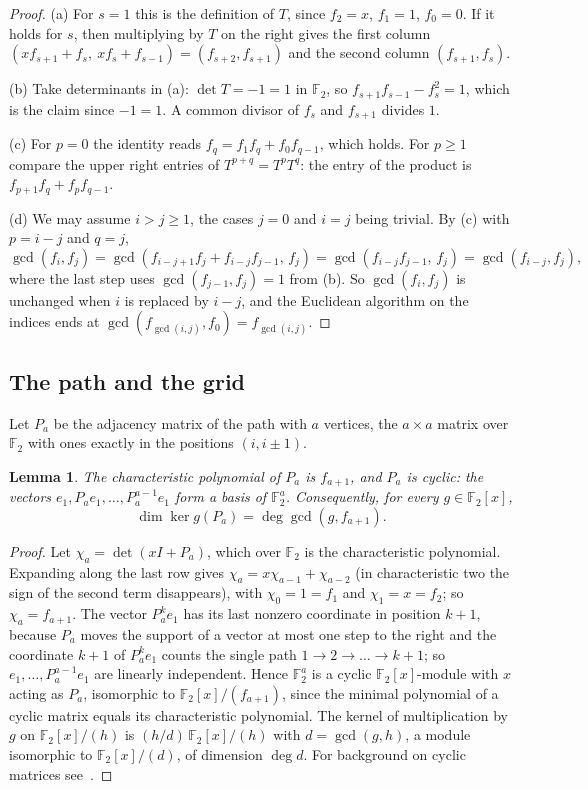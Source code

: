 \documentclass[11pt]{amsart}
\newtheorem{lemma}[theorem]{Lemma}
\theoremstyle{definition}
\theoremstyle{remark}
\numberwithin{equation}{section}
\newcommand{\F}{\mathbb{F}}
\begin{document}
\begin{proof}
(a) For $s=1$ this is the definition of $T$, since $f_2=x$, $f_1=1$, $f_0=0$. If it holds for $s$, then multiplying by $T$ on the right gives the first column $(xf_{s+1}+f_s,\ xf_s+f_{s-1})=(f_{s+2},f_{s+1})$ and the second column $(f_{s+1},f_s)$.

(b) Take determinants in (a): $\det T=-1=1$ in $\F_2$, so $f_{s+1}f_{s-1}-f_s^2=1$, which is the claim since $-1=1$. A common divisor of $f_s$ and $f_{s+1}$ divides $1$.

(c) For $p=0$ the identity reads $f_q=f_1f_q+f_0f_{q-1}$, which holds. For $p\ge1$ compare the upper right entries of $T^{p+q}=T^pT^q$: the entry of the product is $f_{p+1}f_q+f_pf_{q-1}$.

(d) We may assume $i>j\ge1$, the cases $j=0$ and $i=j$ being trivial. By (c) with $p=i-j$ and $q=j$,
\[
\gcd(f_i,f_j)=\gcd(f_{i-j+1}f_j+f_{i-j}f_{j-1},\,f_j)=\gcd(f_{i-j}f_{j-1},\,f_j)=\gcd(f_{i-j},f_j),
\]
where the last step uses $\gcd(f_{j-1},f_j)=1$ from (b). So $\gcd(f_i,f_j)$ is unchanged when $i$ is replaced by $i-j$, and the Euclidean algorithm on the indices ends at $\gcd(f_{\gcd(i,j)},f_0)=f_{\gcd(i,j)}$.
\end{proof}

\subsection{The path and the grid}

Let $P_a$ be the adjacency matrix of the path with $a$ vertices, the $a\times a$ matrix over $\F_2$ with ones exactly in the positions $(i,i\pm1)$.

\begin{lemma}\label{lem:pathmatrix}
The characteristic polynomial of $P_a$ is $f_{a+1}$, and $P_a$ is cyclic: the vectors $e_1,P_ae_1,\dots,P_a^{a-1}e_1$ form a basis of $\F_2^a$. Consequently, for every $g\in\F_2[x]$,
\[
\dim\ker g(P_a)=\deg\gcd(g,f_{a+1}).
\]
\end{lemma}

\begin{proof}
Let $\chi_a=\det(xI+P_a)$, which over $\F_2$ is the characteristic polynomial. Expanding along the last row gives $\chi_a=x\chi_{a-1}+\chi_{a-2}$ (in characteristic two the sign of the second term disappears), with $\chi_0=1=f_1$ and $\chi_1=x=f_2$; so $\chi_a=f_{a+1}$. The vector $P_a^ke_1$ has its last nonzero coordinate in position $k+1$, because $P_a$ moves the support of a vector at most one step to the right and the coordinate $k+1$ of $P_a^ke_1$ counts the single path $1\to2\to\dots\to k+1$; so $e_1,\dots,P_a^{a-1}e_1$ are linearly independent. Hence $\F_2^a$ is a cyclic $\F_2[x]$-module with $x$ acting as $P_a$, isomorphic to $\F_2[x]/(f_{a+1})$, since the minimal polynomial of a cyclic matrix equals its characteristic polynomial. The kernel of multiplication by $g$ on $\F_2[x]/(h)$ is $(h/d)\,\F_2[x]/(h)$ with $d=\gcd(g,h)$, a module isomorphic to $\F_2[x]/(d)$, of dimension $\deg d$. For background on cyclic matrices see~\cite[Section~3.3]{HJ}.
\end{proof}
\end{document}
